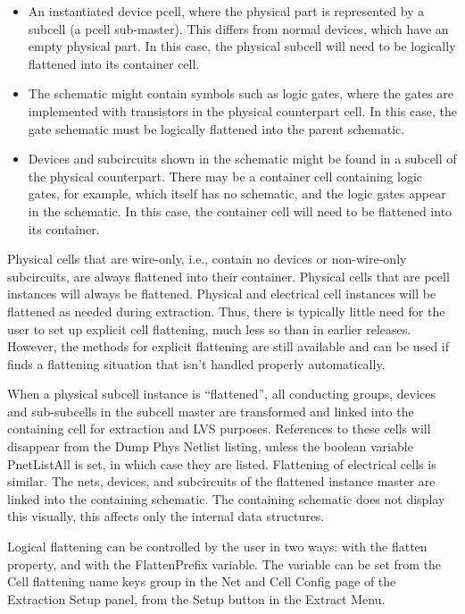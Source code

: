 \begin{itemize}
\item{An instantiated device pcell, where the physical part is
represented by a subcell (a pcell sub-master).  This differs from
normal devices, which have an empty physical part.  In this case, the
physical subcell will need to be logically flattened into its
container cell.}

\item{The schematic might contain symbols such as logic gates, where
the gates are implemented with transistors in the physical counterpart
cell.  In this case, the gate schematic must be logically flattened
into the parent schematic.}

\item{Devices and subcircuits shown in the schematic might be found in
a subcell of the physical counterpart.  There may be a container cell
containing logic gates, for example, which itself has no schematic,
and the logic gates appear in the schematic.  In this case, the
container cell will need to be flattened into its container.}
\end{itemize}

Physical cells that are wire-only, i.e., contain no devices or
non-wire-only subcircuits, are always flattened into their container. 
Physical cells that are pcell instances will always be flattened. 
Physical and electrical cell instances will be flattened as needed
during extraction.  Thus, there is typically little need for the user
to set up explicit cell flattening, much less so than in earlier
{\Xic} releases.  However, the methods for explicit flattening are
still available and can be used if {\Xic} finds a flattening situation
that isn't handled properly automatically.

When a physical subcell instance is ``flattened'', all conducting
groups, devices and sub-subcells in the subcell master are transformed
and linked into the containing cell for extraction and LVS purposes. 
References to these cells will disappear from the {\cb Dump Phys
Netlist} listing, unless the boolean variable {\et PnetListAll} is
set, in which case they are listed.  Flattening of electrical cells is
similar.  The nets, devices, and subcircuits of the flattened instance
master are linked into the containing schematic.  The containing
schematic does not display this visually, this affects only the
internal data structures.

Logical flattening can be controlled by the user in two ways:  with
the {\et flatten} property, and with the {\et FlattenPrefix} variable. 
The variable can be set from the {\cb Cell flattening name keys} group
in the {\cb Net and Cell Config} page of the {\cb Extraction Setup}
panel, from the {\cb Setup} button in the {\cb Extract Menu}.

